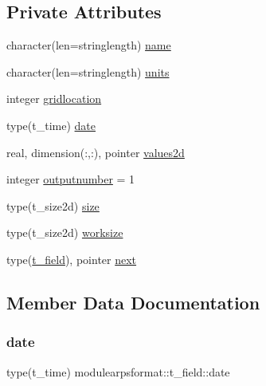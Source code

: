 \subsection*{Private Attributes}
\begin{DoxyCompactItemize}
\item 
character(len=stringlength) \mbox{\hyperlink{structmodulearpsformat_1_1t__field_ae4d30b85f79004092b109c7f8bbc345c}{name}}
\item 
character(len=stringlength) \mbox{\hyperlink{structmodulearpsformat_1_1t__field_a56493fd9bfd162cb1e207dffcddd8aae}{units}}
\item 
integer \mbox{\hyperlink{structmodulearpsformat_1_1t__field_aaaaff0c69f02d42bd35c2cbd7b0fcde7}{gridlocation}}
\item 
type(t\+\_\+time) \mbox{\hyperlink{structmodulearpsformat_1_1t__field_a61ce5bfad856ec8ea3863b31c8bc06b1}{date}}
\item 
real, dimension(\+:,\+:), pointer \mbox{\hyperlink{structmodulearpsformat_1_1t__field_aa0881d34372cd40afaff395e3268e572}{values2d}}
\item 
integer \mbox{\hyperlink{structmodulearpsformat_1_1t__field_a2bc4804545b4768b1930541a95d1c579}{outputnumber}} = 1
\item 
type(t\+\_\+size2d) \mbox{\hyperlink{structmodulearpsformat_1_1t__field_ae44e8d7ac072dbdc508be940e1d985ed}{size}}
\item 
type(t\+\_\+size2d) \mbox{\hyperlink{structmodulearpsformat_1_1t__field_a98427b2b2e2d0ab805d148325add0f34}{worksize}}
\item 
type(\mbox{\hyperlink{structmodulearpsformat_1_1t__field}{t\+\_\+field}}), pointer \mbox{\hyperlink{structmodulearpsformat_1_1t__field_a2183e16653ec50198fcce33236407a82}{next}}
\end{DoxyCompactItemize}


\subsection{Member Data Documentation}
\mbox{\label{structmodulearpsformat_1_1t__field_a61ce5bfad856ec8ea3863b31c8bc06b1}} 
\subsubsection{\texorpdfstring{date}{date}}
{\footnotesize\ttfamily type(t\+\_\+time) modulearpsformat\+::t\+\_\+field\+::date\hspace{0.3cm}{\ttfamily [private]}}

